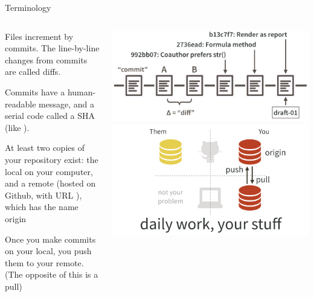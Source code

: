 \documentclass[ignorenonframetext,notes, 10pt, aspectratio=169]{beamer}
\begin{document}
\begin{frame}{Terminology}
\begin{columns}
\begin{column}{0.5\textwidth}
\begin{wideitemize}
\item<1-> Files increment by \alert{commit}s. The line-by-line changes from commits are called \alert{diffs}. 
\item<2-> Commits have a human-readable \alert{message}, and a serial code called a \alert{SHA} (like ).
\item<3-> At least two copies of your repository exist: the \alert{local} on your computer, and a \alert{remote} (hosted on Github, with URL ), \pause which has the name \alert{origin}
\item<4-> Once you make commits on your local, you \alert{push} them to your remote. (The opposite of this is a \alert{pull})
\end{wideitemize}
\end{column}
\begin{column}{0.5\textwidth}
\includegraphics[width = \linewidth]{commit-diff-sha-tag.png}
\includegraphics[width = \linewidth]{pull-push-yours.png}
\end{column}
\end{columns}
\end{frame}
\end{document}
